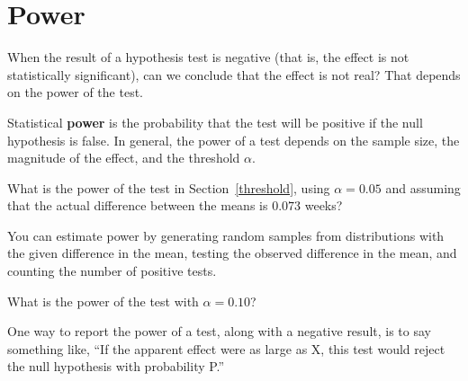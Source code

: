 \documentclass[12pt]{book}
\begin{document}


\section{Power}

When the result of a hypothesis test is negative (that is, the effect is
not statistically significant), can we conclude that the effect is not
real?  That depends on the power of the test.

Statistical {\bf power} is the probability that the test will be
positive if the null hypothesis is false.  In general, the power of a
test depends on the sample size, the magnitude of the effect, and the
threshold $\alpha$.

\begin{ex}

What is the power of the test in Section~\ref{threshold}, using
$\alpha=0.05$ and assuming that the actual difference between the
means is $0.073$ weeks?

You can estimate power by generating random samples from distributions
with the given difference in the mean, testing the observed difference
in the mean, and counting the number of positive tests.

What is the power of the test with $\alpha=0.10$?

\end{ex}

One way to report the power of a test, along with a negative result,
is to say something like, ``If the apparent effect were as large
as X, this test would reject the null hypothesis with probability P.''











\end{document}
